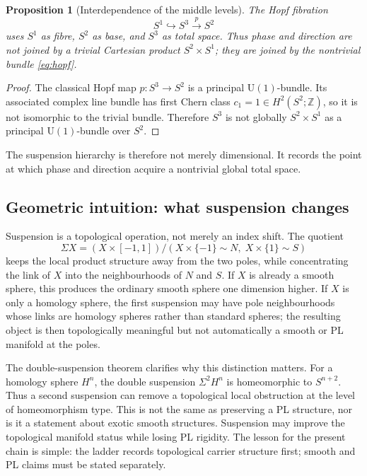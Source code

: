 \documentclass[11pt,a4paper]{article}
\newtheorem{proposition}[theorem]{Proposition}
\theoremstyle{definition}
\theoremstyle{remark}
\newcommand{\Sn}[1]{S^{#1}}
\newcommand{\Sone}{S^{1}}
\newcommand{\Stwo}{S^{2}}
\newcommand{\Sthree}{S^{3}}
\newcommand{\Z}{\mathbb{Z}}
\newcommand{\U}{\mathrm{U}}
\begin{document}
\begin{proposition}[Interdependence of the middle levels]
The Hopf fibration
\begin{equation}
\Sone \hookrightarrow \Sthree \xrightarrow{p} \Stwo
\label{eq:hopf}
\end{equation}
uses $\Sone$ as fibre, $\Stwo$ as base, and $\Sthree$ as total space.  Thus phase and
direction are not joined by a trivial Cartesian product $\Stwo\times\Sone$; they are joined by
the nontrivial bundle \eqref{eq:hopf}.
\end{proposition}

\begin{proof}
The classical Hopf map $p:\Sthree\to\Stwo$ is a principal $\U(1)$-bundle.  Its associated
complex line bundle has first Chern class $c_{1}=1\in H^{2}(\Stwo;\Z)$, so it is not isomorphic
to the trivial bundle.  Therefore $\Sthree$ is not globally $\Stwo\times\Sone$ as a principal
$\U(1)$-bundle over $\Stwo$.
\end{proof}

The suspension hierarchy is therefore not merely dimensional.  It records the point at which
phase and direction acquire a nontrivial global total space.

\subsection{Geometric intuition: what suspension changes}

Suspension is a topological operation, not merely an index shift.  The quotient
\[
\Sigma X=(X\times[-1,1])/(X\times\{-1\}\sim N,\;X\times\{1\}\sim S)
\]
keeps the local product structure away from the two poles, while concentrating the link of
$X$ into the neighbourhoods of $N$ and $S$.  If $X$ is already a smooth sphere, this produces
the ordinary smooth sphere one dimension higher.  If $X$ is only a homology sphere, the first
suspension may have pole neighbourhoods whose links are homology spheres rather than standard
spheres; the resulting object is then topologically meaningful but not automatically a smooth or
PL manifold at the poles.

The double-suspension theorem clarifies why this distinction matters.  For a homology sphere
$H^{n}$, the double suspension $\Sigma^{2}H^{n}$ is homeomorphic to $\Sn{n+2}$.  Thus a second
suspension can remove a topological local obstruction at the level of homeomorphism type.
This is not the same as preserving a PL structure, nor is it a statement about exotic smooth
structures.  Suspension may improve the topological manifold status while losing PL rigidity.
The lesson for the present chain is simple: the ladder records topological carrier structure first;
smooth and PL claims must be stated separately.
\end{document}
